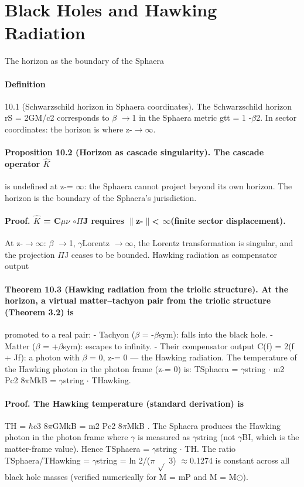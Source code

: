 \section{Black Holes and Hawking Radiation}
The horizon as the boundary of the Sphaera
\paragraph*{Definition}
10.1
(Schwarzschild horizon in Sphaera coordinates). The Schwarzschild horizon rS = 2GM/c2 corresponds to $\beta$ $\to$1 in the Sphaera metric gtt = 1 -$\beta$2. In sector coordinates: the horizon is where z-$\to$$\infty$.
\paragraph*{Proposition 10.2 (Horizon as cascade singularity). The cascade operator $\hat K$}
is undefined at z-= $\infty$: the Sphaera cannot project beyond its own horizon. The horizon is the boundary of the Sphaera's jurisdiction.
\paragraph*{Proof. $\hat K$ = C$\mu$$\nu$ $\circ$$\Pi$J requires $\|$z-$\|$< $\infty$(finite sector displacement).}
At z-$\to$$\infty$: $\beta$ $\to$1, $\gamma$Lorentz $\to$$\infty$, the Lorentz transformation is singular, and the projection $\Pi$J ceases to be bounded. Hawking radiation as compensator output
\paragraph*{Theorem 10.3 (Hawking radiation from the triolic structure). At the horizon, a virtual matter--tachyon pair from the triolic structure (Theorem 3.2) is}
promoted to a real pair:
- Tachyon ($\beta$ = -$\beta$sym): falls into the black hole.
- Matter ($\beta$ = +$\beta$sym): escapes to infinity.
- Their compensator output C(f) =
2(f + Jf): a photon with $\beta$ = 0, z-= 0 --- the Hawking radiation. The temperature of the Hawking photon in the photon frame (z-= 0) is: TSphaera = $\gamma$string $\cdot$ m2 Pc2 8$\pi$MkB = $\gamma$string $\cdot$ THawking.
\paragraph*{Proof. The Hawking temperature (standard derivation) is}
TH = $\hbar$c3 8$\pi$GMkB = m2 Pc2 8$\pi$MkB . The Sphaera produces the Hawking photon in the photon frame where $\gamma$ is measured as $\gamma$string (not $\gamma$BI, which is the matter-frame value). Hence TSphaera = $\gamma$string $\cdot$ TH. The ratio TSphaera/THawking = $\gamma$string = ln 2/($\pi$ $\sqrt{}$ 3) $\approx$0.1274 is constant across all black hole masses (verified numerically for M = mP and M = M$\odot$).
